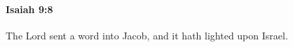 
		\paragraph{Isaiah 9:8} %
			\label{ISAIAH-9-8}

			The Lord sent a word into Jacob, and it hath lighted upon Israel.


